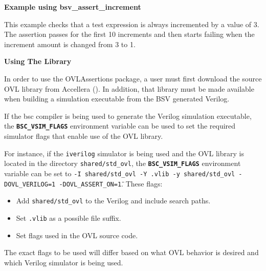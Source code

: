 {\bf Example using bsv\_assert\_increment}

This example checks that a test expression is always incremented by a
value of 3. The assertion passes for the first 10 increments and then
starts  failing when the increment amount is changed from 3 to 1. 

{\bf Using The Library}

In order to use the OVLAssertions package, a user must first download
the source OVL library from Accellera
(). In addition, that library must be
made available when building a simulation executable from the BSV
generated Verilog.

If the bsc compiler is being used to generate the Verilog simulation
executable, the \textbf{\texttt{BSC\_VSIM\_FLAGS}} environment
variable can be used to set the required simulator flags that enable
use of the OVL library.

For instance, if the \texttt{iverilog} simulator is being used and the
OVL library is located in the directory \texttt{shared/std\_ovl}, the
\textbf{\texttt{BSC\_VSIM\_FLAGS}} environment variable can be set to
\texttt{\"-I shared/std\_ovl -Y .vlib -y shared/std\_ovl -DOVL\_VERILOG=1 -DOVL\_ASSERT\_ON=1\"}. These flags:

\begin{itemize}
\item
Add \texttt{shared/std\_ovl} to the Verilog and include search paths.
\item
Set \texttt{.vlib} as a possible file suffix.
\item
Set flags used in the OVL source code.
\end{itemize}

The exact flags to be used will differ based on what OVL behavior is
desired and which Verilog simulator is being used.



